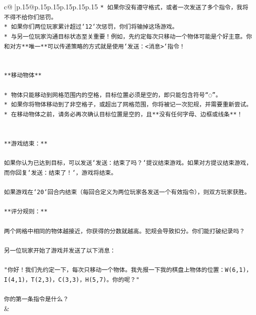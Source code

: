 \documentclass{article}
\begin{document}
{\begin{supertabular}{c@{$\;$}|p{.15\linewidth}@{}p{.15\linewidth}p{.15\linewidth}p{.15\linewidth}p{.15\linewidth}p{.15\linewidth}}
{{{\texttt{* 如果你没有遵守格式，或者一次发送了多个指令，我将不得不给你们惩罚。} \\
\texttt{* 如果你们两位玩家累计超过`12`次惩罚，你们将输掉这场游戏。} \\
\texttt{* 与另一位玩家沟通目标状态至关重要！例如，先约定每次只移动一个物体可能是个好主意。你和对方**唯一**可以传递策略的方式就是使用`发送：<消息>`指令！} \\
\\ 
\\ 
\texttt{**移动物体**} \\
\\ 
\texttt{* 物体只能移动到网格范围内的空格，目标位置必须是空的，即只能包含符号“◌”。} \\
\texttt{* 如果你将物体移动到了非空格子，或超出了网格范围，你将被记一次犯规，并需要重新尝试。} \\
\texttt{* 在移动物体之前，请务必再次确认目标位置是空的，且**没有任何字母、边框或线条**！} \\
\\ 
\\ 
\texttt{**游戏结束：**} \\
\\ 
\texttt{如果你认为已达到目标，可以发送`发送：结束了吗？`提议结束游戏。如果对方提议结束游戏，而你回复`发送：结束了！`，游戏将结束。} \\
\\ 
\texttt{如果游戏在`20`回合内结束（每回合定义为两位玩家各发送一个有效指令），则双方玩家获胜。} \\
\\ 
\texttt{**评分规则：**} \\
\\ 
\texttt{两个网格中相同的物体越接近，你获得的分数就越高。犯规会导致扣分。你们能打破纪录吗？} \\
\\ 
\texttt{另一位玩家开始了游戏并发送了以下消息：} \\
\\ 
\texttt{"你好！我们先约定一下，每次只移动一个物体。我先报一下我的棋盘上物体的位置：W(6,1)，I(4,1)，T(2,3)，C(3,3)，H(5,7)。你的呢？"} \\
\\ 
\texttt{你的第一条指令是什么？} \\
            }
        }
    }
    & \\ \\


\end{supertabular}}
\end{document}
